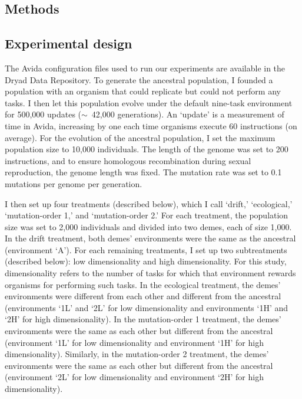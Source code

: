 \begin{doublespace}
\section{Methods}

\subsection{Experimental design}

The Avida configuration files used to run our experiments
are available in the Dryad Data Repository.
%
To generate the ancestral population,
I founded a population with an organism that could replicate
but could not perform any tasks.
%
I then let this population evolve under the default nine-task environment
for 500,000 updates ($\sim$~42,000 generations).
%
An `update' is a measurement of time in Avida, increasing by one each time
organisms execute 60 instructions (on average).
%
For the evolution of the ancestral population,
I set the maximum population size to 10,000 individuals.
%
The length of the genome was set to 200 instructions,
and to ensure homologous recombination
during sexual reproduction, the genome length was fixed.
%
The mutation rate was set to 0.1 mutations per genome per generation.



I then set up four treatments (described below), which I call
`drift,' `ecological,' `mu\-ta\-tion-or\-der 1,' and `mu\-ta\-tion-or\-der 2.'
%
For each treatment,
the population size was set to 2,000 individuals
and divided into two demes, each of size 1,000.
%
In the drift treatment, both demes' environments
were the same as the ancestral (environment `A').
%
For each remaining treatments,
I set up two subtreatments (described below):
low dimensionality and high dimensionality.
%
For this study, dimensionality refers to the number of tasks
for which that environment rewards organisms for performing such tasks.
%
In the ecological treatment, the demes' environments
were different from each other and different from the ancestral
(environments `1L' and `2L' for low dimensionality
and environments `1H' and `2H' for high dimensionality).
%
In the mutation-order 1 treatment,
the demes' environments were the same as each other
but different from the ancestral
(environment `1L' for low dimensionality
and environment `1H' for high dimensionality).
%
Similarly, in the mutation-order 2 treatment,
the demes' environments were the same as each other
but different from the ancestral
(environment `2L' for low dimensionality
and environment `2H' for high dimensionality).




\end{doublespace}
